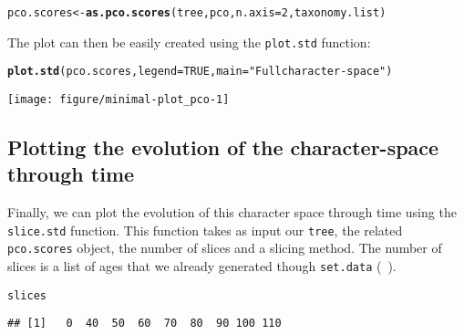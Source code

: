 \documentclass[a4paper,11pt]{article}\usepackage[]{graphicx}\usepackage[]{color}
\makeatletter
\def\maxwidth{ %
  \ifdim\Gin@nat@width>\linewidth
    \linewidth
  \else
    \Gin@nat@width
  \fi
}
\newcommand{\hlnum}[1]{\textcolor[rgb]{0.686,0.059,0.569}{#1}}%
\newcommand{\hlstr}[1]{\textcolor[rgb]{0.192,0.494,0.8}{#1}}%
\newcommand{\hlstd}[1]{\textcolor[rgb]{0.345,0.345,0.345}{#1}}%
\newcommand{\hlkwb}[1]{\textcolor[rgb]{0.69,0.353,0.396}{#1}}%
\newcommand{\hlkwc}[1]{\textcolor[rgb]{0.333,0.667,0.333}{#1}}%
\newcommand{\hlkwd}[1]{\textcolor[rgb]{0.737,0.353,0.396}{\textbf{#1}}}%
\newenvironment{kframe}{%
 \def\at@end@of@kframe{}%
 \ifinner\ifhmode%
  \def\at@end@of@kframe{\end{minipage}}%
  \begin{minipage}{\columnwidth}%
 \fi\fi%
 \def\FrameCommand##1{\hskip\@totalleftmargin \hskip-\fboxsep
 \colorbox{shadecolor}{##1}\hskip-\fboxsep
     \hskip-\linewidth \hskip-\@totalleftmargin \hskip\columnwidth}%
 \MakeFramed {\advance\hsize-\width
   \@totalleftmargin\z@ \linewidth\hsize
   \@setminipage}}%
 {\par\unskip\endMakeFramed%
 \at@end@of@kframe}
\newenvironment{knitrout}{}{} %
\makeatother
\begin{document}
\begin{knitrout}
\color{fgcolor}\begin{kframe}
\begin{alltt}
\hlstd{pco.scores}\hlkwb{<-}\hlkwd{as.pco.scores}\hlstd{(tree, pco,} \hlkwc{n.axis}\hlstd{=}\hlnum{2}\hlstd{, taxonomy.list)}
\end{alltt}
\end{kframe}
\end{knitrout}

The plot can then be easily created using the \texttt{plot.std} function:

\begin{knitrout}
\color{fgcolor}\begin{kframe}
\begin{alltt}
\hlkwd{plot.std}\hlstd{(pco.scores,} \hlkwc{legend}\hlstd{=}\hlnum{TRUE}\hlstd{,} \hlkwc{main}\hlstd{=}\hlstr{"Full character-space"}\hlstd{)}
\end{alltt}
\end{kframe}

{\centering \texttt{[image: figure/minimal-plot\_pco-1]} 

}



\end{knitrout}

\subsection{Plotting the evolution of the character-space through time}
Finally, we can plot the evolution of this character space through time using the \texttt{slice.std} function.
This function takes as input our \texttt{tree}, the related \texttt{pco.scores} object, the number of slices and a slicing method.
The number of slices is a list of ages that we already generated though \texttt{set.data} (~\label{data}).

\begin{knitrout}
\color{fgcolor}\begin{kframe}
\begin{alltt}
\hlstd{slices}
\end{alltt}
\begin{verbatim}
## [1]   0  40  50  60  70  80  90 100 110
\end{verbatim}
\end{kframe}
\end{knitrout}
\end{document}
